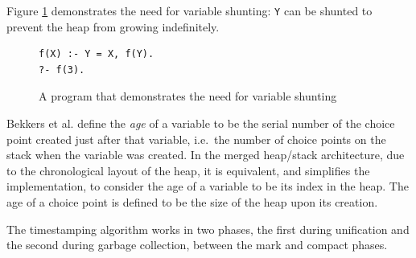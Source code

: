 Figure \ref{fig:shunt-program} demonstrates the need for variable shunting: \texttt{Y} can be shunted to prevent the heap from growing indefinitely.

\begin{figure}[H]
\centering
\begin{verbatim}
f(X) :- Y = X, f(Y).
?- f(3).
\end{verbatim}
\caption{A program that demonstrates the need for variable shunting}
\label{fig:shunt-program}
\end{figure}

Bekkers et al. define the \emph{age} of a variable to be the serial number of the choice point created just after that variable, i.e.\ the number of choice points on the stack when the variable was created. In the merged heap/stack architecture, due to the chronological layout of the heap, it is equivalent, and simplifies the implementation, to consider the age of a variable to be its index in the heap. The age of a choice point is defined to be the size of the heap upon its creation.

The timestamping algorithm works in two phases, the first during unification and the second during garbage collection, between the mark and compact phases.


